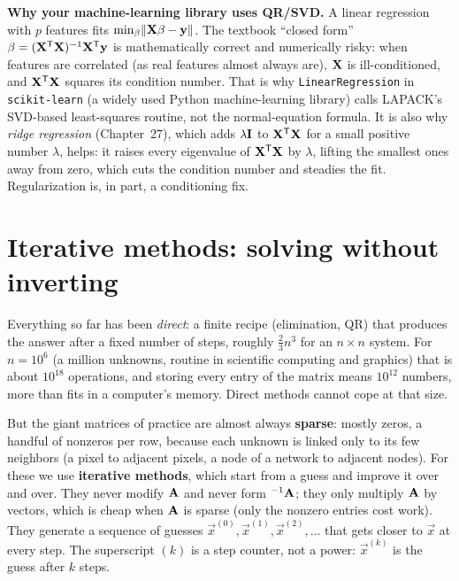\begin{applicationbox}
\textbf{Why your machine-learning library uses QR/SVD.} A linear
regression with $p$ features fits $\min_{\mathbf{\beta}}\lVert\mathbf{X}\mathbf{\beta} - \mathbf{y}\rVert$.
The textbook ``closed form'' $\mathbf{\beta} = (\mathbf{X}^{\mathsf{T}}\mathbf{X})^{-1}\mathbf{X}^{\mathsf{T}}\mathbf{y}$ is
mathematically correct and numerically risky: when features are correlated (as real
features almost always are), $\mathbf{X}$ is ill-conditioned, and $\mathbf{X}^{\mathsf{T}}\mathbf{X}$ squares
its condition number. That is why \texttt{LinearRegression} in \texttt{scikit-learn} (a
widely used Python machine-learning library) calls LAPACK's SVD-based least-squares
routine, not the normal-equation formula. It is also why \emph{ridge regression}
(Chapter~27), which adds $\lambda\mathbf{I}$ to $\mathbf{X}^{\mathsf{T}}\mathbf{X}$ for a small positive
number $\lambda$, helps: it raises every eigenvalue of $\mathbf{X}^{\mathsf{T}}\mathbf{X}$ by $\lambda$,
lifting the smallest ones away from zero, which cuts the condition number and steadies
the fit. Regularization is, in part, a conditioning fix.
\end{applicationbox}

\section{Iterative methods: solving without inverting}

Everything so far has been \emph{direct}: a finite recipe (elimination, QR) that
produces the answer after a fixed number of steps, roughly $\tfrac23 n^3$ for an
$n\times n$ system. For $n=10^6$ (a million unknowns, routine in scientific computing
and graphics) that is about $10^{18}$ operations, and storing every entry of the matrix
means $10^{12}$ numbers, more than fits in a computer's memory. Direct methods cannot
cope at that size.

But the giant matrices of practice are almost always \textbf{sparse}: mostly zeros, a
handful of nonzeros per row, because each unknown is linked only to its few neighbors (a
pixel to adjacent pixels, a node of a network to adjacent nodes). For these we use
\textbf{iterative methods}, which start from a guess and improve it over and over. They
never modify $\mathbf{A}$ and never form $^{-1}{\mathbf{A}}$; they only multiply $\mathbf{A}$ by
vectors, which is cheap when $\mathbf{A}$ is sparse (only the nonzero entries cost work).
They generate a sequence of guesses $\vec{x}^{(0)},
\vec{x}^{(1)},\vec{x}^{(2)},\ldots$ that gets closer to $\vec{x}$ at every step. The
superscript $(k)$ is a step counter, not a power: $\vec{x}^{(k)}$ is the guess after $k$
steps.

